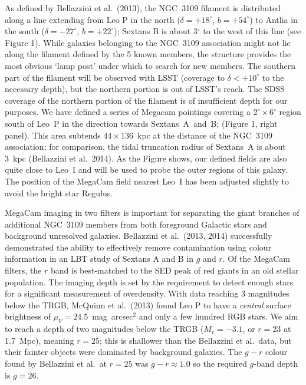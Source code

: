 As defined by Bellazzini et al.\ (2013), the NGC~3109 filament is  distributed along a line extending from Leo P in the 
north ($\delta = +18^{\circ}$, $b = +54^{\circ}$) to
Antlia in the south ($\delta = -27^{\circ}$, $b = +22^{\circ}$); Sextans B is about 3$^{\circ}$ to the west of this line (see Figure 1).
While galaxies belonging to the NGC~3109 association might not lie along the filament defined by
the 5 known members, the structure provides the most obvious `lamp post' under which to search for new
members. The southern part of the filament will be observed with LSST (coverage to $\delta < +10^{\circ}$ to the necessary depth),
but the northern portion is out of LSST's reach. The SDSS coverage of the northern portion of the filament
is of insufficient depth for our purposes.
We have defined a series of Megacam pointings covering a $2^{\circ}\times6^{\circ}$ region south
of Leo~P in the direction towards Sextans~A~and~B; (Figure 1, right panel). This area subtends $44\times136$~kpc
at the distance of the NGC~3109 association; for comparison, the tidal truncation radius of Sextans~A is
about 3~kpc (Bellazzini et al.\ 2014). As the Figure shows,  our defined fields are also
quite close to Leo~I and will be used to probe the outer regions of this galaxy. 
The position of the MegaCam field nearest Leo~I has been adjusted slightly to avoid the bright star Regulus.


MegaCam imaging in two filters is important for separating the giant branches of additional NGC~3109
members from both foreground Galactic stars and background unresolved galaxies.  Bellazzini et al.\ (2013, 2014)
successfully demonstrated the ability to effectively remove contamination using colour information
in an LBT study of Sextans A and B in $g$ and $r$. Of the MegaCam filters, the $r$ band is best-matched to the SED 
peak of red giants in an old stellar population.
The imaging depth is set by the requirement to detect enough stars for a significant measurement of overdensity. 
With data reaching 3 magnitudes below the TRGB, McQuinn et al.\ (2013) found Leo P to have a {\em central} surface brightness 
of $\mu_V=24.5$~mag~arcsec$^2$ and only a few hundred RGB stars. We aim to reach 
a depth of two magnitudes below the TRGB ($M_r = -3.1$, or  $r=23$ at 1.7~Mpc), meaning $r=25$;
this is shallower than the Bellazzini et al.\  data, but their fainter objects were dominated by background galaxies. 
The $g-r$ colour found by Bellazzini et al.\ at $r=25$ was $g-r\approx 1.0$ so the required $g$-band depth is $g=26$.

